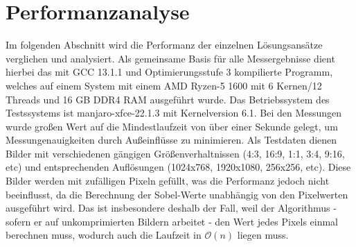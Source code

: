 \documentclass[course=erap]{aspdoc}
\begin{document}
\section{Performanzanalyse}\label{sec:performanzanalyse}
Im folgenden Abschnitt wird die Performanz der einzelnen Lösungsansätze verglichen und analysiert.
Als gemeinsame Basis für alle Messergebnisse dient hierbei das mit GCC 13.1.1 und Optimierungsstufe 3 kompilierte Programm, welches auf einem System mit einem AMD Ryzen-5 1600 mit 6 Kernen/12 Threads und 16 GB DDR4 RAM ausgeführt wurde.
Das Betriebssystem des Testssystems ist manjaro-xfce-22.1.3 mit Kernelversion 6.1.
Bei den Messungen wurde großen Wert auf die Mindestlaufzeit von über einer Sekunde gelegt, um Messungenauigkeiten durch Außeinflüsse zu minimieren.
Als Testdaten dienen Bilder mit verschiedenen gängigen Größenverhaltnissen (4:3, 16:9, 1:1, 3:4, 9:16, etc) und entsprechenden Auflösungen (1024x768, 1920x1080, 256x256, etc).
Diese Bilder werden mit zufälligen Pixeln gefüllt, was die Performanz jedoch nicht beeinflusst, da die Berechnung der Sobel-Werte unabhängig von den Pixelwerten ausgeführt wird.
Das ist insbesondere deshalb der Fall, weil der Algorithmus - sofern er auf unkomprimierten Bildern arbeitet - den Wert jedes Pixels einmal berechnen muss, wodurch auch die Laufzeit in $\mathcal{O}(n)$ liegen muss.
\end{document}
